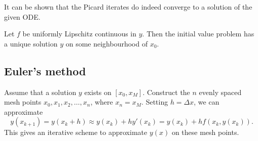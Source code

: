 \documentclass[11pt]{article}
\theoremstyle{definition}
\theoremstyle{remark}
\numberwithin{equation}{section}
\begin{document}
    It can be shown that the Picard iterates do indeed converge to a solution of the
    given ODE.
    
    \begin{theorem}
        Let $f$ be uniformly Lipschitz continuous in $y$. Then the initial value
        problem has a unique solution $y$ on some neighbourhood of $x_0$.
    \end{theorem}

    
    \subsection{Euler's method}

    Assume that a solution $y$ exists on $[x_0, x_M]$. Construct the $n$ evenly
    spaced mesh points $x_0, x_1, x_2, \dots, x_n$, where $x_n = x_M$. Setting $h =
    \Delta x$, we can approximate \[
        y(x_{k + 1}) = y(x_k + h) \approx y(x_k) + hy'(x_k) = y(x_k) + hf(x_k,
        y(x_k)).
    \] This gives an iterative scheme to approximate $y(x)$ on these mesh points.
    
    
    
\end{document}
